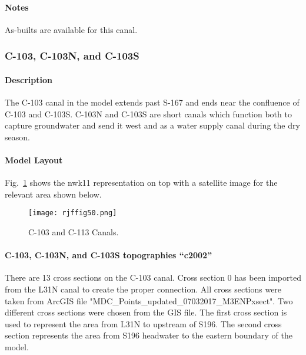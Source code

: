 \begin{notes}
\paragraph{Notes}
As-builts are available for this canal.
\end{notes}

\clearpage
\subsubsection{C-103, C-103N, and C-103S}
\paragraph{Description}
The C-103 canal in the model extends past S-167 and ends near the confluence of C-103 and C-103S. C-103N and C-103S are short canals which function both to capture groundwater and send it west and as a water supply canal during the dry season.

\paragraph{Model Layout}
Fig.~\ref{fig:rjffig50} shows the nwk11 representation on top with a satellite image for the relevant area shown below.


\begin{figure}[!h]
  \begin{center}
  \texttt{[image: rjffig50.png]}
  \caption{C-103 and C-113 Canals.}
  \label{fig:rjffig50}
  \end{center}
\end{figure}


\paragraph{C-103, C-103N, and C-103S topographies ``c2002''}
There are 13 cross sections on the C-103 canal.  Cross section 0 has been imported from the L31N canal to create the proper connection.  All cross sections were taken from ArcGIS file "MDC\_Points\_updated\_07032017\_M3ENPxsect".  Two different cross sections were chosen from the GIS file.  The first cross section is used to represent the area from L31N to upstream of S196.  The second cross section represents the area from S196 headwater to the eastern boundary of the model.

